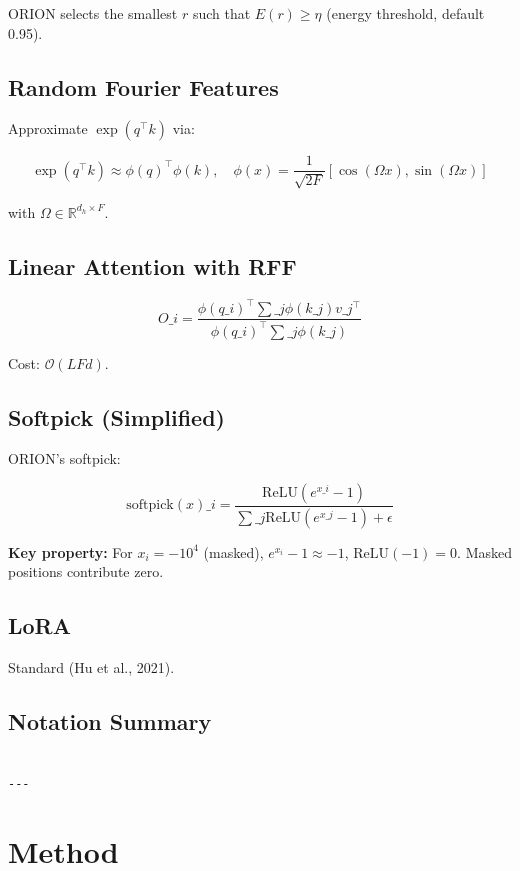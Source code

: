 ORION selects the smallest $r$ such that $E(r) \geq \eta$ (energy threshold, 
default 0.95).

\subsection{Random Fourier Features}

Approximate $\exp(q^\top k)$ via:

\[
\exp(q^\top k) \approx \phi(q)^\top \phi(k), \quad
\phi(x) = \frac{1}{\sqrt{2F}} [\cos(\Omega x), \sin(\Omega x)]
\tag{3.4}
\]

with $\Omega \in \mathbb{R}^{d_h \times F}$.

\subsection{Linear Attention with RFF}

\[
O\_i = \frac{\phi(q\_i)^\top \sum\_j \phi(k\_j) v\_j^\top}{\phi(q\_i)^\top \sum\_j \phi(k\_j)}
\tag{3.5}
\]

Cost: $\mathcal{O}(L F d)$.

\subsection{Softpick (Simplified)}

ORION's softpick:

\[
\text{softpick}(x)\_i = \frac{\text{ReLU}(e^{x\_i} - 1)}{\sum\_j \text{ReLU}(e^{x\_j} - 1) + \epsilon}
\tag{3.6}
\]

\textbf{Key property:} For $x_i = -10^4$ (masked), $e^{x_i} - 1 \approx -1$, 
$\text{ReLU}(-1) = 0$. Masked positions contribute zero.

\subsection{LoRA}

Standard (Hu et al., 2021).

\subsection{Notation Summary}

\begin{lstlisting}

---
\end{lstlisting}


\section{Method}

